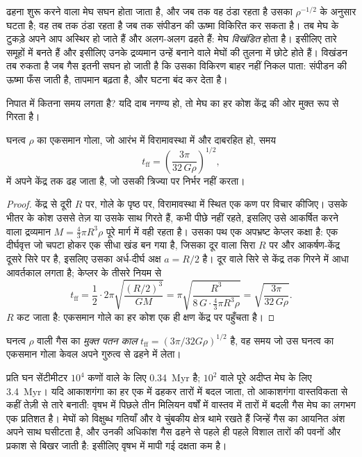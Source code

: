 ढहना शुरू करने वाला मेघ सघन होता जाता है, और जब तक वह ठंडा रहता है उसका 
$\rho^{-1/2}$ के अनुसार घटता है; वह तब तक ठंडा रहता है जब तक संपीडन की ऊष्मा
विकिरित कर सकता है। तब मेघ के टुकड़े अपने आप अस्थिर हो जाते हैं
और अलग-अलग ढहते हैं: मेघ \emph{विखंडित} होता है। इसीलिए तारे
समूहों में बनते हैं और इसीलिए उनके द्रव्यमान उन्हें बनाने वाले मेघों की तुलना में छोटे होते
हैं। विखंडन तब रुकता है जब गैस इतनी सघन हो जाती है कि उसका विकिरण
बाहर नहीं निकल पाता: संपीडन की ऊष्मा फँस जाती है, तापमान बढ़ता है, और
 घटना बंद कर देता है।

निपात में कितना समय लगता है? यदि दाब नगण्य हो, तो मेघ का हर कोश
केंद्र की ओर मुक्त रूप से गिरता है।

\begin{proposition}[मुक्त पतन काल]\label{prop:b2:ism-star-formation:free-fall}
घनत्व $\rho$ का एकसमान गोला, जो आरंभ में विरामावस्था में और दाबरहित हो,
समय
\[
  t_{\mathrm{ff}} = \left(\frac{3\pi}{32\,G\rho}\right)^{1/2},
\]
में अपने केंद्र तक ढह जाता है, जो उसकी त्रिज्या पर निर्भर नहीं करता।
\end{proposition}

\begin{proof}
केंद्र से दूरी $R$ पर, गोले के पृष्ठ पर, विरामावस्था में स्थित एक कण पर
विचार कीजिए। उसके भीतर के कोश उससे तेज़ या उसके साथ गिरते हैं, कभी
पीछे नहीं रहते, इसलिए उसे आकर्षित करने वाला द्रव्यमान $M = \tfrac43\pi R^3\rho$ पूरे
मार्ग में वही रहता है। उसका पथ एक अपभ्रष्ट केप्लर कक्षा है: एक दीर्घवृत्त जो चपटा होकर
एक सीधा खंड बन गया है, जिसका दूर वाला सिरा $R$ पर और आकर्षण-केंद्र
दूसरे सिरे पर है, इसलिए उसका अर्ध-दीर्घ अक्ष $a = R/2$ है। दूर वाले सिरे से
केंद्र तक गिरने में आधा आवर्तकाल लगता है; केप्लर के तीसरे नियम से
\[
  t_{\mathrm{ff}} = \frac12\cdot 2\pi\sqrt{\frac{(R/2)^3}{GM}}
  = \pi\sqrt{\frac{R^3}{8\,G\cdot\frac43\pi R^3\rho}}
  = \sqrt{\frac{3\pi}{32\,G\rho}} .
\]
$R$ कट जाता है: एकसमान गोले का हर कोश एक ही
क्षण केंद्र पर पहुँचता है।
\end{proof}

\begin{definition}[मुक्त पतन काल]\label{def:b2:ism-star-formation:free-fall}
घनत्व $\rho$ वाली गैस का \emph{मुक्त पतन काल}
$t_{\mathrm{ff}} = (3\pi/32G\rho)^{1/2}$ है, वह समय जो उस घनत्व का एकसमान गोला
केवल अपने गुरुत्व से ढहने में लेता।
\end{definition}

प्रति घन सेंटीमीटर $10^4$ कणों वाले  के लिए 
\qty{0.34}{Myr} है; $10^2$ वाले पूरे अदीप्त मेघ के लिए \qty{3.4}{Myr}। यदि
आकाशगंगा का हर  एक  में ढहकर तारों में बदल जाता,
तो आकाशगंगा वास्तविकता से कहीं तेज़ी से तारे बनाती: वृषभ में पिछले तीन मिलियन वर्षों में
वास्तव में तारों में बदली गैस
मेघ का लगभग एक प्रतिशत है। मेघों को
विक्षुब्ध गतियाँ और वे चुंबकीय क्षेत्र थामे रखते हैं जिन्हें गैस का आयनित अंश अपने साथ घसीटता है,
और उनकी अधिकांश गैस ढहने से पहले ही पहले विशाल तारों की पवनों और प्रकाश से बिखर
जाती है: इसीलिए वृषभ में मापी गई दक्षता कम है।

